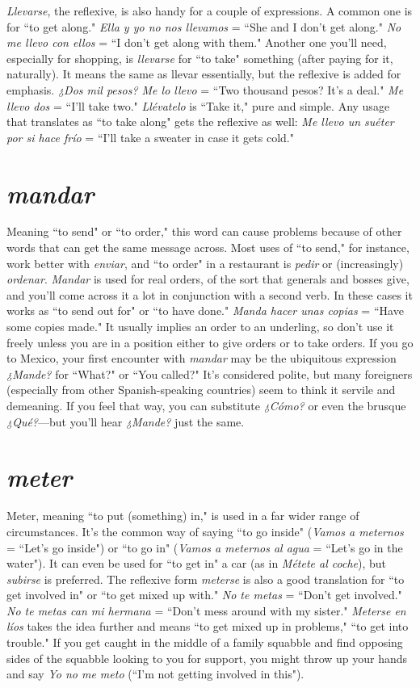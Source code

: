 \emph{Llevarse}, the reflexive, is also handy for a couple of expressions. A common one is for ``to get along." \emph{Ella y yo no nos llevamos}
= ``She and I don't get along." \emph{No me llevo con ellos} = ``I don't get
along with them." Another one you'll need, especially for shopping,
is \emph{llevarse} for ``to take" something (after paying for it, naturally). It
means the same as llevar essentially, but the reflexive is added for emphasis. \emph{¿Dos mil pesos? Me lo llevo} = ``Two thousand pesos? It's a
deal." \emph{Me llevo dos} = ``I'll take two." \emph{Llévatelo} is ``Take it," pure and
simple. Any usage that translates as ``to take along" gets the reflexive
as well: \emph{Me llevo un suéter por si hace frío} = ``I'll take a sweater in
case it gets cold."

\section{\emph{mandar}}

Meaning ``to send" or ``to order," this word can cause problems because of other words that can get the same message across.
Most uses of ``to send," for instance, work better with \emph{enviar}, and ``to
order" in a restaurant is \emph{pedir} or (increasingly) \emph{ordenar}. \emph{Mandar} is
used for real orders, of the sort that generals and bosses give, and you'll
come across it a lot in conjunction with a second verb. In these cases
it works as ``to send out for" or ``to have done." \emph{Manda hacer unas copias} = ``Have some copies made." It usually implies an order to an underling, so don't use it freely unless you are in a position either to give
orders or to take orders. If you go to Mexico, your first encounter with
\emph{mandar} may be the ubiquitous expression \emph{¿Mande?} for ``What?" or
``You called?" It's considered polite, but many foreigners (especially
from other Spanish-speaking countries) seem to think it servile and demeaning. If you feel that way, you can substitute \emph{¿Cómo?} or even the
brusque \emph{¿Qué?}---but you'll hear \emph{¿Mande?} just the same.

\section{\emph{meter}}

Meter, meaning ``to put (something) in," is used in a far wider
range of circumstances. It's the common way of saying ``to go inside"
(\emph{Vamos a meternos} = ``Let's go inside") or ``to go in" (\emph{Vamos a meternos al agua} = ``Let's go in the water"). It can even be used for ``to get
in" a car (as in \emph{Métete al coche}), but \emph{subirse} is preferred. The reflexive
form \emph{meterse} is also a good translation for ``to get involved in" or ``to
get mixed up with." \emph{No te metas} = ``Don't get involved." \emph{No te metas
	can mi hermana} = ``Don't mess around with my sister." \emph{Meterse en
	líos} takes the idea further and means ``to get mixed up in problems,"
``to get into trouble." If you get caught in the middle of a family
squabble and find opposing sides of the squabble looking to you for
support, you might throw up your hands and say \emph{Yo no me meto} (``I'm
not getting involved in this").

